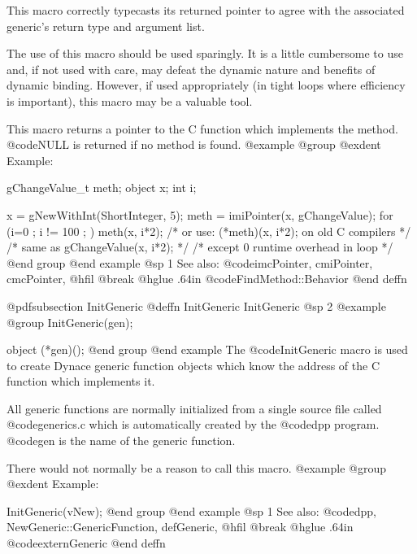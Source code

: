 {{{{This macro correctly typecasts its returned pointer to agree with
the associated generic's return type and argument list.

The use of this macro should be used sparingly.  It is a little
cumbersome to use and, if not used with care, may defeat the dynamic
nature and benefits of dynamic binding.  However, if used appropriately
(in tight loops where efficiency is important), this macro may be
a valuable tool.

This macro returns a pointer to the C function which implements the method.
@code{NULL} is returned if no method is found.
@example
@group
@exdent Example:

gChangeValue_t    meth;
object  x;
int     i;

x = gNewWithInt(ShortInteger, 5);
meth = imiPointer(x, gChangeValue);
for (i=0 ; i != 100 ; )
        meth(x, i*2);
/* or use:  (*meth)(x, i*2);  on old C compilers */
/* same as gChangeValue(x, i*2);  */
/* except 0 runtime overhead in loop          */
@end group
@end example
@sp 1
See also:  @code{imcPointer, cmiPointer, cmcPointer,}
@hfil @break @hglue .64in         @code{FindMethod::Behavior}
@end deffn











@pdfsubsection {InitGeneric}
@deffn {InitGeneric} InitGeneric
@sp 2
@example
@group
InitGeneric(gen);

object  (*gen)();
@end group
@end example
The @code{InitGeneric} macro is used to create Dynace generic function
objects which know the address of the C function which implements it.

All generic functions are normally initialized from a single source file
called @code{generics.c} which is automatically created by the
@code{dpp} program.  @code{gen} is the name of the generic
function.

There would not normally be a reason to call this macro.
@example
@group
@exdent Example:

InitGeneric(vNew);
@end group
@end example
@sp 1
See also:  @code{dpp, NewGeneric::GenericFunction, defGeneric,}
@hfil @break @hglue .64in         @code{externGeneric}
@end deffn














}}}}
